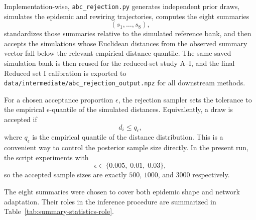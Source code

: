\documentclass[11pt]{article}
\begin{document}
Implementation-wise, \texttt{abc\_rejection.py} generates independent prior draws, simulates the epidemic and rewiring trajectories, computes the eight summaries
\[
(s_1,\ldots,s_8),
\]
standardizes those summaries relative to the simulated reference bank, and then accepts the simulations whose Euclidean distances from the observed summary vector fall below the relevant empirical distance quantile. The same saved simulation bank is then reused for the reduced-set study A--I, and the final Reduced set I calibration is exported to \texttt{data/intermediate/abc\_rejection\_output.npz} for all downstream methods.

For a chosen acceptance proportion $\epsilon$, the rejection sampler sets the tolerance to the empirical $\epsilon$-quantile of the simulated distances. Equivalently, a draw is accepted if
\[
d_i \le q_{\epsilon},
\]
where $q_{\epsilon}$ is the empirical quantile of the distance distribution. This is a convenient way to control the posterior sample size directly. In the present run, the script experiments with
\[
\epsilon \in \{0.005,\; 0.01,\; 0.03\},
\]
so the accepted sample sizes are exactly $500$, $1000$, and $3000$ respectively.

The eight summaries were chosen to cover both epidemic shape and network adaptation. Their roles in the inference procedure are summarized in Table~\ref{tab:summary-statistics-role}.
\end{document}
